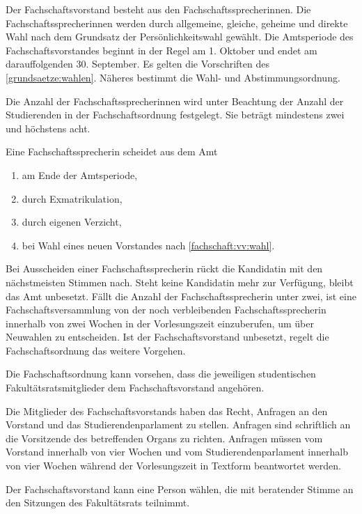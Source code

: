 \begin{contract}
Der Fachschaftsvorstand besteht aus den Fach\-schafts\-sprech\-erinnen. Die Fach\-schafts\-sprech\-erinnen werden durch allgemeine, gleiche, geheime und direkte Wahl nach dem Grundsatz der Persönlichkeitswahl gewählt. Die Amtsperiode des Fachschaftsvorstandes beginnt in der Regel am 1. Oktober und endet am darauffolgenden 30. September. Es gelten die Vorschriften des \ref{grundsaetze:wahlen}. Näheres bestimmt die Wahl- und Abstimmungsordnung.

Die Anzahl der Fachschaftssprecherinnen wird unter Beachtung der Anzahl der Studierenden in der Fachschaftsordnung festgelegt. Sie beträgt mindestens zwei und höchstens acht. \label{fs:vorstand:anzahl}

%
%

Eine Fachschaftssprecherin scheidet aus dem Amt
  \begin{enumerate}
  \item am Ende der Amtsperiode,
  \item durch Exmatrikulation,
  \item durch eigenen Verzicht,
  \item bei Wahl eines neuen Vorstandes nach \ref{fachschaft:vv:wahl}.
\end{enumerate}

Bei Ausscheiden einer Fach\-schafts\-sprecherin rückt die Kandidatin mit den nächstmeisten Stimmen nach. Steht keine Kandidatin mehr zur Verfügung, bleibt das Amt unbesetzt. Fällt die Anzahl der Fach\-schafts\-sprecherin unter zwei, ist eine Fach\-schafts\-versammlung von der noch verbleibenden Fach\-schafts\-sprecherin innerhalb von zwei Wochen in der Vorlesungszeit einzuberufen, um über Neuwahlen zu entscheiden. Ist der Fach\-schafts\-vorstand unbesetzt, regelt die Fach\-schafts\-ordnung das weitere Vorgehen.

Die Fach\-schafts\-ordnung kann vorsehen, dass die jeweiligen studentischen Fakultätsratsmitglieder dem Fachschaftsvorstand angehören.

Die Mitglieder des Fachschaftsvorstands haben das Recht, Anfragen an den  Vorstand und das Studierendenparlament zu stellen. Anfragen sind  schriftlich an die Vorsitzende des betreffenden Organs zu richten.  Anfragen müssen vom Vorstand innerhalb von vier Wochen und vom Studierendenparlament innerhalb von vier Wochen während der Vorlesungszeit in Textform beantwortet werden.

Der Fachschaftsvorstand kann eine Person wählen, die mit beratender Stimme an den Sitzungen des Fakultätsrats teilnimmt.



\end{contract}

